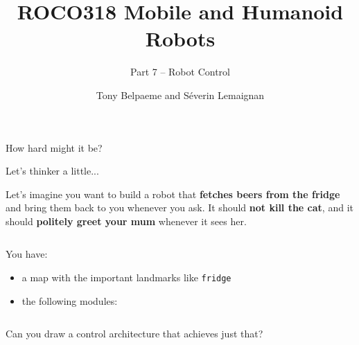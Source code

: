 \documentclass[compress]{beamer}
\title{ROCO318 \newline Mobile and Humanoid Robots}
\subtitle{Part 7 -- Robot Control}
\date{}
\author{Tony Belpaeme and Séverin Lemaignan}
\institute{Centre for Neural Systems and Robotics\\{\bf Plymouth University}}
\begin{document}

\maketitle

\begin{frame}[plain]{}

    \Large

    \centering
    How hard might it be?

\end{frame}


\begin{frame}{Let's thinker a little...}

    Let's imagine you want to build a robot that {\bf fetches beers from the fridge}
    and bring them back to you whenever you ask. It should {\bf not kill the cat},
    and it should {\bf politely greet your mum} whenever it sees her.

    \begin{columns}
        \begin{column}{0.5\linewidth}

            You have:
            \begin{itemize}
                \item a map with the important landmarks like {\tt fridge}
                \item the following modules:
            \end{itemize}
        \end{column}
        \begin{column}{0.5\linewidth}
            \begin{center}
            \end{center}
        \end{column}
    \end{columns}

    Can you draw a control architecture that achieves just that?
\end{frame}
\end{document}
